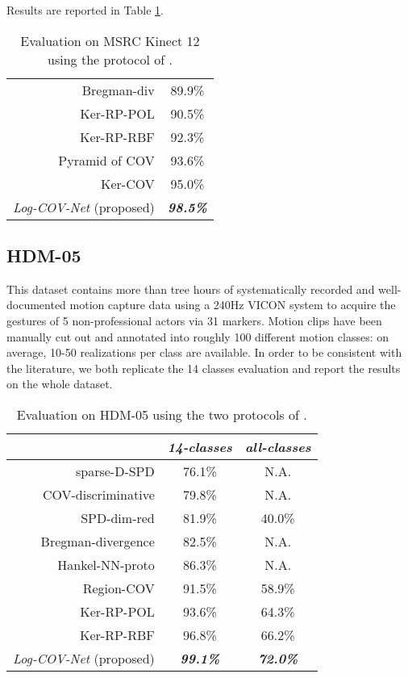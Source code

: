 \documentclass[10pt,twocolumn]{article}
\begin{document}
Results are reported in Table \ref{tab:MS}.

\begin{table}[h!]
	\centering
	\begin{tabular}{|rc|}
	\hline
	Bregman-div \cite{Harandi:CVPR14} & 89.9\%   \\
	Ker-RP-POL \cite{Wang:ICCV15} & 90.5\%  \\
	Ker-RP-RBF \cite{Wang:ICCV15} & 92.3\%  \\
	Pyramid of COV \cite{egizi} & 93.6\% \\
	Ker-COV \cite{Cavazza:ICPR16} & 95.0\% \\ \hline \hline
	\textit{Log-COV-Net} (proposed) & \textbf{\textit{98.5\%}} \\ \hline
\end{tabular}\vspace{5pt}
	\caption{Evaluation on MSRC Kinect 12 using the protocol of \cite{egizi}.}
\label{tab:MS}
\end{table}

\subsection{HDM-05}

This dataset contains more than tree hours of systematically recorded and well-documented motion capture data using a 240Hz VICON system to acquire the gestures of 5 non-professional actors via 31 markers. Motion clips have been manually cut out and annotated into roughly 100 different motion classes: on average, 10-50 realizations per class are available. In order to be consistent with the literature, we both replicate the 14 classes evaluation \cite{Wang:ICCV15,Cavazza:ICPR16} and report the results on the whole dataset.

\begin{table}[h!]
	\centering
	\begin{tabular}{|rcc|}
		\hline
		& \textit{14-classes} & \textit{all-classes} \\ \hline\hline
		sparse-D-SPD \cite{Har1} & 76.1\% & N.A. \\
		COV-discriminative \cite{COVdiscr} & 79.8\% & N.A. \\
		SPD-dim-red \cite{Har2} & 81.9\% & 40.0\% \\
		Bregman-divergence \cite{Harandi:CVPR14}  & 82.5\% & N.A. \\
		Hankel-NN-proto \cite{Camps:CVPR16} & 86.3\% & N.A. \\
		Region-COV \cite{Tuzel} & 91.5\% & 58.9\% \\
		Ker-RP-POL \cite{Wang:ICCV15} & 93.6\% & 64.3\% \\
		Ker-RP-RBF \cite{Wang:ICCV15} & 96.8\% & 66.2\% \\ \hline \hline
		\textit{\textit{Log-COV-Net} } (proposed) & \textit{\textbf{99.1\%}} & \textit{\textbf{72.0\%}} \\ \hline
	\end{tabular}\vspace{5pt}
	\caption{Evaluation on HDM-05 using the two protocols of \cite{Wang:ICCV15}.}
	\label{tab:05}
\end{table}
\end{document}
